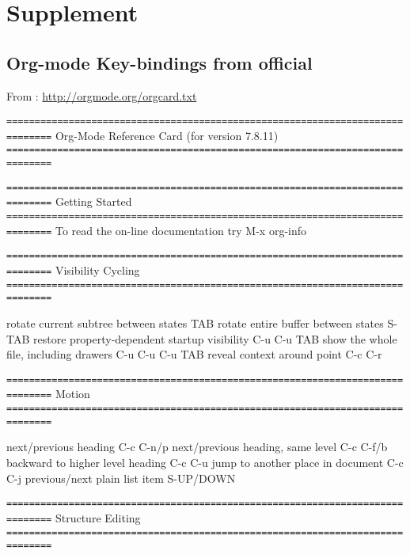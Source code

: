 \documentclass[10pt,a4paper]{article}
\begin{document}
\section{Supplement}
\label{sec-5}
\subsection{Org-mode Key-bindings from official}
\label{sec-5-1}
From : \url{http://orgmode.org/orgcard.txt}

\texttt{==============================================================================}
Org-Mode Reference Card (for version 7.8.11)
\texttt{==============================================================================}



\texttt{==============================================================================}
Getting Started
\texttt{==============================================================================}
To read the on-line documentation try             M-x org-info

\texttt{==============================================================================}
Visibility Cycling
\texttt{==============================================================================}

rotate current subtree between states             TAB
rotate entire buffer between states               S-TAB
restore property-dependent startup visibility     C-u C-u TAB
show the whole file, including drawers            C-u C-u C-u TAB
reveal context around point                       C-c C-r

\texttt{==============================================================================}
Motion
\texttt{==============================================================================}

next/previous heading                             C-c C-n/p
next/previous heading, same level                 C-c C-f/b
backward to higher level heading                  C-c C-u
jump to another place in document                 C-c C-j
previous/next plain list item                     S-UP/DOWN\notetwo

\texttt{==============================================================================}
Structure Editing
\texttt{==============================================================================}
\end{document}
